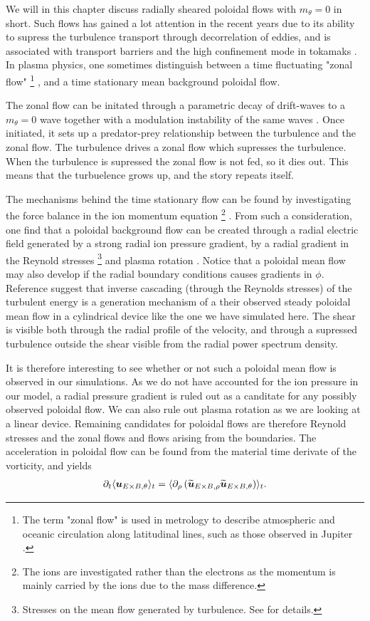 We will in this chapter discuss radially sheared poloidal flows with $m_\theta = 0$ in short.
Such flows has gained a lot attention in the recent years due to its ability to supress the turbulence transport through decorrelation of eddies, and is associated with transport barriers and the high confinement mode in tokamaks \cite{Terry2000,Diamond2005a,Viezzer2012Phd}.
In plasma physics, one sometimes distinguish between a time fluctuating "zonal flow"%
\footnote{The term "zonal flow" is used in metrology to describe atmospheric and oceanic circulation along latitudinal lines, such as those observed in Jupiter \cite{Limaye1986}.}%
, and a time stationary mean background poloidal flow.

The zonal flow can be initated through a parametric decay of drift-waves to a $m_\theta=0$ wave together with a modulation instability of the same waves \cite{Diamond2005a}.
Once initiated, it sets up a predator-prey relationship between the turbulence and the zonal flow.
The turbulence drives a zonal flow which supresses the turbulence.
When the turbulence is supressed the zonal flow is not fed, so it dies out.
This means that the turbuelence grows up, and the story repeats itself.

The mechanisms behind the time stationary flow can be found by investigating the force balance in the ion momentum equation%
\footnote{The ions are investigated rather than the electrons as the momentum is mainly carried by the ions due to the mass difference.}%
%
.
From such a consideration, one find that a poloidal background flow can be created through a radial electric field generated by a strong radial ion pressure gradient, by a radial gradient in the Reynold stresses
\footnote{Stresses on the mean flow generated by turbulence.
See \cite{Kundu2010book} for details.}%
and plasma rotation \cite{Terry2000}.
Notice that a poloidal mean flow may also develop if the radial boundary conditions causes gradients in $\phi$.
Reference \cite{Tynan2006a} suggest that inverse cascading (through the Reynolds stresses) of the turbulent energy is a generation mechanism of a their observed steady poloidal mean flow in a cylindrical device like the one we have simulated here.
The shear is visible both through the radial profile of the velocity, and through a supressed turbulence outside the shear visible from the radial power spectrum density.

It is therefore interesting to see whether or not such a poloidal mean flow is observed in our simulations.
As we do not have accounted for the ion pressure in our model, a radial pressure gradient is ruled out as a canditate for any possibly observed poloidal flow.
We can also rule out plasma rotation as we are looking at a linear device.
Remaining candidates for poloidal flows are therefore Reynold stresses and the zonal flows and flows arising from the boundaries.
The acceleration in poloidal flow can be found from the material time derivate of the vorticity, and yields \cite{Diamond1991}
%
\begin{align*}
    \partial_t \langle{\boldsymbol{u}_{E\times B,\theta}}\rangle_t = \langle{\partial_\rho\left(\widetilde{ \boldsymbol{u}}_{E\times B,\rho}\widetilde{ \boldsymbol{u}}_{E\times B,\theta}\right)}\rangle_t.
\end{align*}
%

